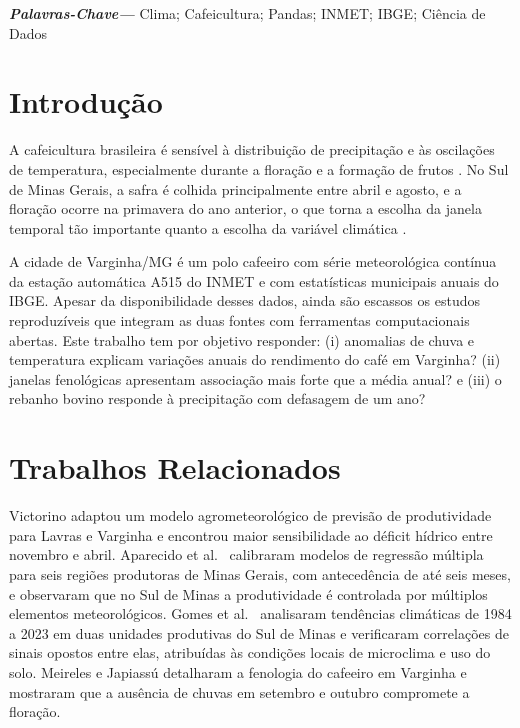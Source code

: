 \documentclass[12pt]{article}
\providecommand{\palavraschave}[1]{%
  \par\vspace{6pt}\small\noindent\textbf{\textit{Palavras-Chave---}} #1\par}
\begin{document}
\palavraschave{Clima; Cafeicultura; Pandas; INMET; IBGE; Ci{\^e}ncia de Dados}

\section{Introdu{\c{c}}{\~a}o}

A cafeicultura brasileira {\'e} sens{\'i}vel {\`a} distribui{\c{c}}{\~a}o de precipita{\c{c}}{\~a}o e
{\`a}s oscila{\c{c}}{\~o}es de temperatura, especialmente durante a flora{\c{c}}{\~a}o e a
forma{\c{c}}{\~a}o de frutos \cite{ipcc2021,aparecido2016}. No Sul de Minas Gerais, a
safra {\'e} colhida principalmente entre abril e agosto, e a flora{\c{c}}{\~a}o ocorre na
primavera do ano anterior, o que torna a escolha da janela temporal t{\~a}o
importante quanto a escolha da vari{\'a}vel clim{\'a}tica \cite{meireles2009}.

A cidade de Varginha/MG {\'e} um polo cafeeiro com s{\'e}rie meteorol{\'o}gica cont{\'i}nua
da esta{\c{c}}{\~a}o autom{\'a}tica A515 do INMET e com estat{\'i}sticas municipais anuais do
IBGE. Apesar da disponibilidade desses dados, ainda s{\~a}o escassos os estudos
reproduz{\'i}veis que integram as duas fontes com ferramentas computacionais
abertas. Este trabalho tem por objetivo responder: (i) anomalias de chuva e
temperatura explicam varia{\c{c}}{\~o}es anuais do rendimento do caf{\'e} em Varginha? (ii)
janelas fenol{\'o}gicas apresentam associa{\c{c}}{\~a}o mais forte que a m{\'e}dia anual? e
(iii) o rebanho bovino responde {\`a} precipita{\c{c}}{\~a}o com defasagem de um ano?

\section{Trabalhos Relacionados}

Victorino \cite{victorino2015} adaptou um modelo agrometeorol{\'o}gico de previs{\~a}o de
produtividade para Lavras e Varginha e encontrou maior sensibilidade ao d{\'e}ficit
h{\'i}drico entre novembro e abril. Aparecido et al.\ \cite{aparecido2016} calibraram
modelos de regress{\~a}o m{\'u}ltipla para seis regi{\~o}es produtoras de Minas Gerais, com
anteced{\^e}ncia de at{\'e} seis meses, e observaram que no Sul de Minas a produtividade
{\'e} controlada por m{\'u}ltiplos elementos meteorol{\'o}gicos. Gomes et al.\ \cite{gomes2026}
analisaram tend{\^e}ncias clim{\'a}ticas de 1984 a 2023 em duas unidades produtivas do
Sul de Minas e verificaram correla{\c{c}}{\~o}es de sinais opostos entre elas, atribu{\'i}das
{\`a}s condi{\c{c}}{\~o}es locais de microclima e uso do solo. Meireles e Japiass{\'u}
\cite{meireles2009} detalharam a fenologia do cafeeiro em Varginha e mostraram que a
aus{\^e}ncia de chuvas em setembro e outubro compromete a flora{\c{c}}{\~a}o.
\end{document}
